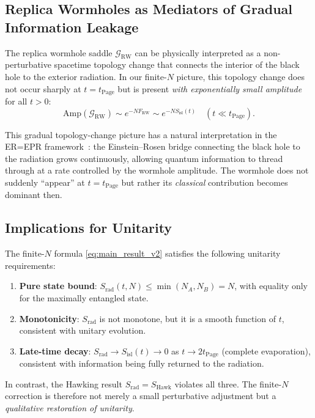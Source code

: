 \documentclass[12pt,a4paper]{article}
\newcommand{\Srad}{S_{\mathrm{rad}}}
\newcommand{\SHawk}{S_{\mathrm{Hawk}}}
\newcommand{\Sisl}{S_{\mathrm{isl}}}
\newcommand{\tPage}{t_{\mathrm{Page}}}
\begin{document}
\subsection{Replica Wormholes as Mediators of Gradual Information Leakage}
\label{subsec:wormhole_mediation}

The replica wormhole saddle $\mathcal{G}_{\mathrm{RW}}$ can be physically
interpreted as a non-perturbative spacetime topology change that connects the
interior of the black hole to the exterior radiation.  In our finite-$N$
picture, this topology change does not occur sharply at $t = \tPage$ but is
present \emph{with exponentially small amplitude} for all $t > 0$:
\begin{equation}
  \mathrm{Amp}(\mathcal{G}_{\mathrm{RW}}) \sim e^{-N F_{\mathrm{RW}}}
    \sim e^{-N \Sisl(t)} \quad (t \ll \tPage).
\label{eq:rw_amplitude}
\end{equation}

This gradual topology-change picture has a natural interpretation in the
ER=EPR framework~\citep{Maldacena2013}: the Einstein--Rosen bridge connecting
the black hole to the radiation grows continuously, allowing quantum
information to thread through at a rate controlled by the wormhole amplitude.
The wormhole does not suddenly ``appear'' at $t = \tPage$ but rather its
\emph{classical} contribution becomes dominant then.

\subsection{Implications for Unitarity}
\label{subsec:unitarity}

The finite-$N$ formula \cref{eq:main_result_v2} satisfies the following
unitarity requirements:
\begin{enumerate}[label=(\roman*)]
  \item \textbf{Pure state bound}: $\Srad(t,N) \le \min(N_A, N_B) = N$, with
    equality only for the maximally entangled state.
  \item \textbf{Monotonicity}: $\Srad$ is not monotone, but it is a smooth
    function of $t$, consistent with unitary evolution.
  \item \textbf{Late-time decay}: $\Srad \to \Sisl(t) \to 0$ as $t \to 2\tPage$
    (complete evaporation), consistent with information being fully returned
    to the radiation.
\end{enumerate}

In contrast, the Hawking result $\Srad = \SHawk$ violates all three.  The
finite-$N$ correction is therefore not merely a small perturbative adjustment
but a \emph{qualitative restoration of unitarity}.
\end{document}
